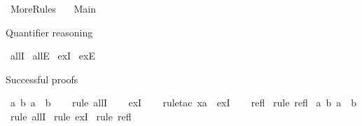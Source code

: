 %
\begin{isabellebody}%
%
%
\isadelimtheory
%
\endisadelimtheory
%
\isatagtheory
{}\isamarkupfalse%
\ MoreRules\isanewline
\ \ \ Main\ \isanewline
{}%
\endisatagtheory
{\isafoldtheory}%
%
\isadelimtheory
%
\endisadelimtheory
%
\isadelimdocument
%
\endisadelimdocument
%
\isatagdocument
%
\isamarkuptrue%
%
\endisatagdocument
{\isafolddocument}%
%
\isadelimdocument
%
\endisadelimdocument
%
\begin{isamarkuptext}%
Quantifier reasoning%
\end{isamarkuptext}\isamarkuptrue%
\isamarkupfalse%
\ allI\isanewline
{}\isamarkupfalse%
\ allE\isanewline
{}\isamarkupfalse%
\ exI\isanewline
{}\isamarkupfalse%
\ exE%
\begin{isamarkuptext}%
Successful proofs%
\end{isamarkuptext}\isamarkuptrue%
\isamarkupfalse%
\ {\isachardoublequoteopen}{\isasymforall}a{\isachardot}{\kern0pt}\ {\isasymexists}b{\isachardot}{\kern0pt}\ a\ {\isacharequal}{\kern0pt}\ b{\isachardoublequoteclose}\isanewline
%
\isadelimproof
\ \ %
\endisadelimproof
%
\isatagproof
{}\isamarkupfalse%
\ {\isacharparenleft}{\kern0pt}rule\ allI{\isacharparenright}{\kern0pt}\isanewline
\ \ \isamarkupfalse%
\ exI\isanewline
\ \ \isamarkupfalse%
\ {\isacharparenleft}{\kern0pt}rule{\isacharunderscore}{\kern0pt}tac\ x{\isacharequal}{\kern0pt}{\isachardoublequoteopen}a{\isachardoublequoteclose}\ \ exI{\isacharparenright}{\kern0pt}\isanewline
\ \ \isamarkupfalse%
\ refl\isanewline
{}\isamarkupfalse%
\ {\isacharparenleft}{\kern0pt}rule\ refl{\isacharparenright}{\kern0pt}\isanewline
{}\isamarkupfalse%
%
\endisatagproof
{\isafoldproof}%
%
\isadelimproof
\isanewline
%
\endisadelimproof
\isanewline
{}\isamarkupfalse%
\ {\isachardoublequoteopen}{\isasymforall}a{\isachardot}{\kern0pt}\ {\isasymexists}b{\isachardot}{\kern0pt}\ a\ {\isacharequal}{\kern0pt}\ b{\isachardoublequoteclose}\isanewline
%
\isadelimproof
%
\endisadelimproof
%
\isatagproof
{}\isamarkupfalse%
\ {\isacharparenleft}{\kern0pt}rule\ allI{\isacharparenright}{\kern0pt}\isanewline
{}\isamarkupfalse%
\ {\isacharparenleft}{\kern0pt}rule\ exI{\isacharparenright}{\kern0pt}\isanewline
{}\isamarkupfalse%
\ {\isacharparenleft}{\kern0pt}rule\ refl{\isacharparenright}{\kern0pt}\isanewline

\end{isabellebody}

